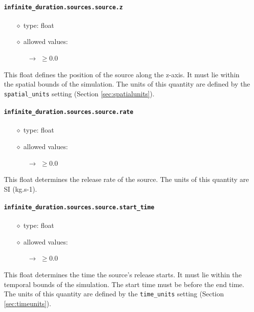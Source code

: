 \documentclass[]{article}
\def\code#1{\texttt{#1}}
\begin{document}
\paragraph{\code{infinite\_duration.sources.source.z}}\label{sec:infsourcez}
\begin{itemize}
    \item[$\diamond$] type: float 
    \item[$\diamond$] allowed values:
    \begin{itemize}
        \item[$\rightarrow$] $\geq0.0$
    \end{itemize}
\end{itemize}
This float defines the position of the source along the z-axis. It must lie
within the spatial bounds of the simulation. The units of this quantity are
defined by the \code{spatial\_units} setting (Section \ref{sec:spatialunits}).

\paragraph{\code{infinite\_duration.sources.source.rate}}\label{sec:infsourcerate}
\begin{itemize}
    \item[$\diamond$] type: float 
    \item[$\diamond$] allowed values:
    \begin{itemize}
        \item[$\rightarrow$] $\geq0.0$
    \end{itemize}
\end{itemize}
This float determines the release rate of the source. The units of this quantity
are SI (kg.s-1).

\paragraph{\code{infinite\_duration.sources.source.start\_time}}\label{sec:infsourcestarttime}
\begin{itemize}
    \item[$\diamond$] type: float 
    \item[$\diamond$] allowed values:
    \begin{itemize}
        \item[$\rightarrow$] $\geq0.0$
    \end{itemize}
\end{itemize}
This float determines the time the source's release starts. It must lie within
the temporal bounds of the simulation. The start time must be before the end
time. The units of this quantity are defined by the \code{time\_units} setting
(Section \ref{sec:timeunits}).
\end{document}
